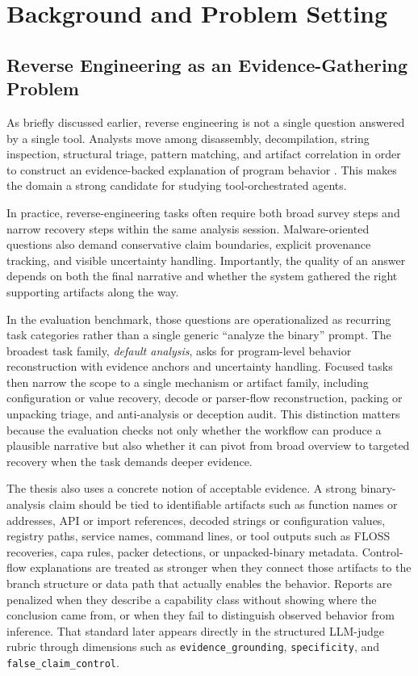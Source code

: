\chapter{Background and Problem Setting}
\label{sec:background}

\section{Reverse Engineering as an Evidence-Gathering Problem}

As briefly discussed earlier, reverse engineering is not a single question answered by a single tool. Analysts move among disassembly, decompilation, string inspection, structural triage, pattern matching, and artifact correlation in order to construct an evidence-backed explanation of program behavior \cite{mattei2022reusability,yakdan2016johnny}. This makes the domain a strong candidate for studying tool-orchestrated agents.

In practice, reverse-engineering tasks often require both broad survey steps and narrow recovery steps within the same analysis session. Malware-oriented questions also demand conservative claim boundaries, explicit provenance tracking, and visible uncertainty handling. Importantly, the quality of an answer depends on both the final narrative and whether the system gathered the right supporting artifacts along the way.

In the evaluation benchmark, those questions are operationalized as recurring task categories rather than a single generic ``analyze the binary'' prompt. The broadest task family, \emph{default analysis}, asks for program-level behavior reconstruction with evidence anchors and uncertainty handling. Focused tasks then narrow the scope to a single mechanism or artifact family, including configuration or value recovery, decode or parser-flow reconstruction, packing or unpacking triage, and anti-analysis or deception audit. This distinction matters because the evaluation checks not only whether the workflow can produce a plausible narrative but also whether it can pivot from broad overview to targeted recovery when the task demands deeper evidence.

The thesis also uses a concrete notion of acceptable evidence. A strong binary-analysis claim should be tied to identifiable artifacts such as function names or addresses, API or import references, decoded strings or configuration values, registry paths, service names, command lines, or tool outputs such as FLOSS recoveries, capa rules, packer detections, or unpacked-binary metadata. Control-flow explanations are treated as stronger when they connect those artifacts to the branch structure or data path that actually enables the behavior. Reports are penalized when they describe a capability class without showing where the conclusion came from, or when they fail to distinguish observed behavior from inference. That standard later appears directly in the structured LLM-judge rubric through dimensions such as \texttt{evidence\_grounding}, \texttt{specificity}, and \texttt{false\_claim\_control}.

